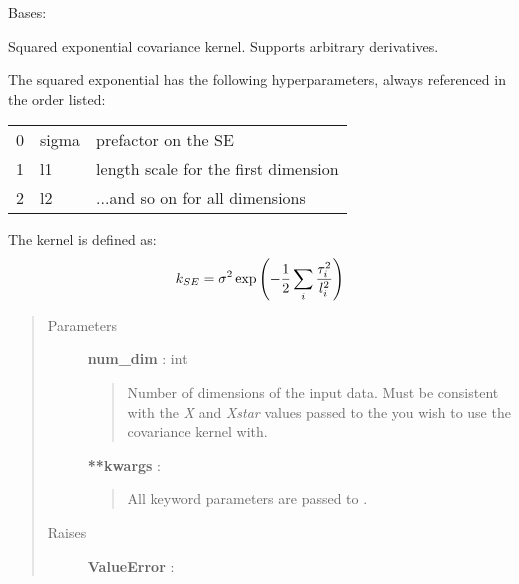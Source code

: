 \documentclass[letterpaper,10pt,english]{sphinxmanual}
\begin{document}
\begin{fulllineitems}
\label{gptools.kernel:gptools.kernel.squared_exponential.SquaredExponentialKernel}
Bases: {\hyperref[gptools.kernel:gptools.kernel.core.Kernel]{}}

Squared exponential covariance kernel. Supports arbitrary derivatives.

The squared exponential has the following hyperparameters, always
referenced in the order listed:

\begin{tabulary}{\linewidth}{|L|L|L|}
\hline

0
 & 
sigma
 & 
prefactor on the SE
\\

1
 & 
l1
 & 
length scale for the first dimension
\\

2
 & 
l2
 & 
...and so on for all dimensions
\\
\hline\end{tabulary}


The kernel is defined as:
\begin{gather}
\begin{split}k_{SE} = \sigma^2 \exp\left(-\frac{1}{2}\sum_i\frac{\tau_i^2}{l_i^2}\right)\end{split}\notag
\end{gather}\begin{quote}\begin{description}
\item[{Parameters}] \leavevmode
\textbf{num\_dim} : int
\begin{quote}

Number of dimensions of the input data. Must be consistent
with the \emph{X} and \emph{Xstar} values passed to the
{\hyperref[gptools:gptools.gaussian_process.GaussianProcess]{}} you
wish to use the covariance kernel with.
\end{quote}

\textbf{**kwargs} :
\begin{quote}

All keyword parameters are passed to {\hyperref[gptools.kernel:gptools.kernel.core.Kernel]{}}.
\end{quote}

\item[{Raises}] \leavevmode
\textbf{ValueError} :
\begin{quote}


\end{quote}
\end{description}
\end{quote}
\end{fulllineitems}
\end{document}
